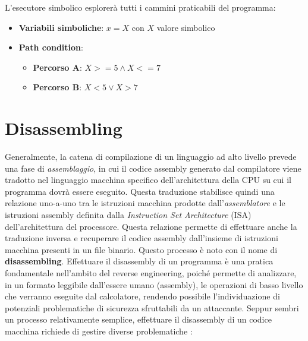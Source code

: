 \documentclass[../main.tex]{subfiles}
\begin{document}

L'esecutore simbolico esplorerà tutti i cammini praticabili del programma:
\begin{itemize}
    \item \textbf{Variabili simboliche}: $x = X$ con $X$ valore simbolico
    \item \textbf{Path condition}:
    \begin{itemize}
        \item \textbf{Percorso A}: $X >= 5 \land X <= 7$
        \item \textbf{Percorso B}: $X < 5 \vee X > 7$
    \end{itemize}
\end{itemize}
\section{Disassembling}
Generalmente, la catena di compilazione di un linguaggio ad alto livello prevede una fase di \textit{assemblaggio}, in cui il codice assembly generato dal compilatore viene tradotto
nel linguaggio macchina specifico dell'architettura della CPU su cui il programma dovrà essere eseguito. Questa traduzione stabilisce quindi una relazione uno-a-uno tra le istruzioni macchina
prodotte dall'\textit{assemblatore} e le istruzioni assembly definita dalla \textit{Instruction Set Architecture} (ISA) dell'architettura del processore.
Questa relazione permette di effettuare anche la traduzione inversa e recuperare il codice assembly dall'insieme di istruzioni macchina presenti in un file binario.
Questo processo è noto con il nome di \textbf{disassembling}. Effettuare il disassembly di un programma è una pratica fondamentale nell'ambito del reverse engineering, poiché permette di analizzare, in un formato leggibile dall'essere umano (assembly), le operazioni
di basso livello che verranno eseguite dal calcolatore, rendendo possibile l'individuazione di potenziali problematiche di sicurezza sfruttabili da un attaccante.
Seppur sembri un processo relativamente semplice, effettuare il disassembly di un codice macchina richiede di gestire diverse problematiche \cite{Disassembly2}:
\end{document}
